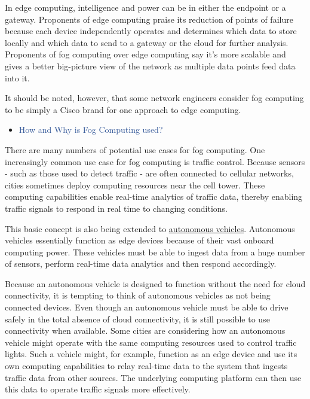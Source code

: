 \documentclass[11pt]{article}
\begin{document}
In edge computing, intelligence and power can be in either the endpoint or a gateway. Proponents of edge computing praise its reduction of points of failure because each device independently operates and determines which data to store locally and which data to send to a gateway or the cloud for further analysis. Proponents of fog computing over edge computing say it's more scalable and gives a better big-picture view of the network as multiple data points feed data into it.

It should be noted, however, that some network engineers consider fog computing to be simply a Cisco brand for one approach to edge computing.



\newpage

\vspace{1\baselineskip}
\begin{itemize}
\item {\Large \textcolor[HTML]{2F5496}{How and Why is Fog Computing used?}}
\end{itemize}

There are many numbers of potential use cases for fog computing. One increasingly common use case for fog computing is traffic control. Because sensors - such as those used to detect traffic - are often connected to cellular networks, cities sometimes deploy computing resources near the cell tower. These computing capabilities enable real-time analytics of traffic data, thereby enabling traffic signals to respond in real time to changing conditions.

This basic concept is also being extended to \href{https://www.techtarget.com/searchenterpriseai/feature/Future-of-autonomous-vehicles-depends-on-driver-attitudes}{\uline{autonomous vehicles}}. Autonomous vehicles essentially function as edge devices because of their vast onboard computing power. These vehicles must be able to ingest data from a huge number of sensors, perform real-time data analytics and then respond accordingly.

Because an autonomous vehicle is designed to function without the need for cloud connectivity, it is tempting to think of autonomous vehicles as not being connected devices. Even though an autonomous vehicle must be able to drive safely in the total absence of cloud connectivity, it is still possible to use connectivity when available. Some cities are considering how an autonomous vehicle might operate with the same computing resources used to control traffic lights. Such a vehicle might, for example, function as an edge device and use its own computing capabilities to relay real-time data to the system that ingests traffic data from other sources. The underlying computing platform can then use this data to operate traffic signals more effectively.
\end{document}
